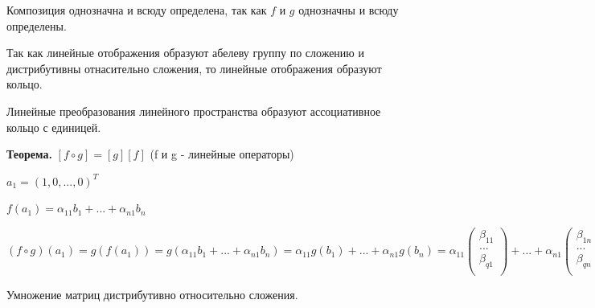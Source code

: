 \documentclass[a4paper]{article}
\begin{document}
    Композиция однозначна и всюду определена, так как $f$ и $g$ однозначны и всюду определены.

    Так как линейные отображения образуют абелеву группу по сложению и дистрибутивны отнасительно сложения, то линейные отображения образуют кольцо.

    Линейные преобразования линейного пространства образуют ассоциативное кольцо с единицей.

    \begin{htheorem}
        \textbf{Теорема.} $[f \circ g] = [g][f]$ (f и g - линейные операторы)
    \end{htheorem}

    \begin{hproof}
        $a_1 = (1,0,...,0)^T$

        $f(a_1) = \alpha_{11}b_1 + ... + \alpha_{n1}b_n$

        $\displaystyle (f \circ g)(a_1) = g(f(a_1)) = g(\alpha_{11}b_1 + ... + \alpha_{n1}b_n) = \alpha_{11}g(b_1) + ... + \alpha_{n1}g(b_n) =
        \alpha_11 \begin{pmatrix}
                      \beta_{11} \\
                      ...        \\
                      \beta_{q1} \\
        \end{pmatrix} + ... + \alpha_{n1} \begin{pmatrix}
                                              \beta_{1n} \\
                                              ...        \\
                                              \beta_{qn} \\
        \end{pmatrix} = [g] \begin{pmatrix}
                                \alpha_{11} \\
                                ...         \\
                                \alpha_{n1} \\
        \end{pmatrix} = [g(f(a))] = [g][f](a)$


    \end{hproof}

    \begin{htheorem}
        Умножение матриц дистрибутивно относительно сложения.
    \end{htheorem}
\end{document}
